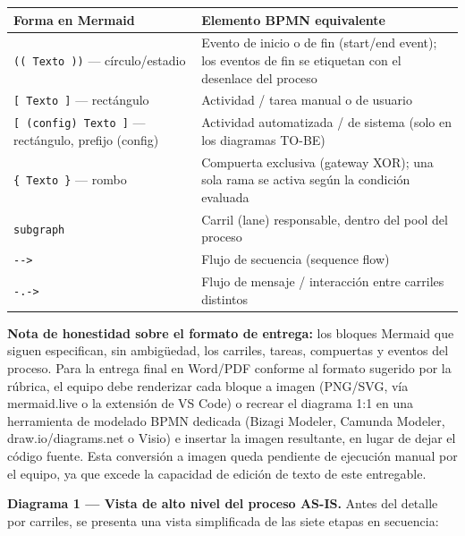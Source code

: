 \documentclass[11pt,a4paper]{article}
\begin{document}
{\small
\begin{longtable}[]{@{}
  >{\raggedright\arraybackslash}p{}
  >{\raggedright\arraybackslash}p{}@{}}
\toprule\noalign{}
\begin{minipage}[b]{\linewidth}\raggedright
Forma en Mermaid
\end{minipage} & \begin{minipage}[b]{\linewidth}\raggedright
Elemento BPMN equivalente
\end{minipage} \\
\midrule\noalign{}
\endhead
\bottomrule\noalign{}
\endlastfoot
\texttt{((\ Texto\ ))} --- círculo/estadio & Evento de inicio o de fin (start/end event); los eventos de fin se etiquetan con el desenlace del proceso \\
\texttt{{[}\ Texto\ {]}} --- rectángulo & Actividad / tarea manual o de usuario \\
\texttt{{[}\ (config)\ Texto\ {]}} --- rectángulo, prefijo (config) & Actividad automatizada / de sistema (solo en los diagramas TO-BE) \\
\texttt{\{\ Texto\ \}} --- rombo & Compuerta exclusiva (gateway XOR); una sola rama se activa según la condición evaluada \\
\texttt{subgraph} & Carril (lane) responsable, dentro del pool del proceso \\
\texttt{-\/-\textgreater{}} & Flujo de secuencia (sequence flow) \\
\texttt{-.-\textgreater{}} & Flujo de mensaje / interacción entre carriles distintos \\
\end{longtable}
}

\textbf{Nota de honestidad sobre el formato de entrega:} los bloques Mermaid que siguen especifican, sin ambigüedad, los carriles, tareas, compuertas y eventos del proceso. Para la entrega final en Word/PDF conforme al formato sugerido por la rúbrica, el equipo debe renderizar cada bloque a imagen (PNG/SVG, vía mermaid.live o la extensión de VS Code) o recrear el diagrama 1:1 en una herramienta de modelado BPMN dedicada (Bizagi Modeler, Camunda Modeler, draw.io/diagrams.net o Visio) e insertar la imagen resultante, en lugar de dejar el código fuente. Esta conversión a imagen queda pendiente de ejecución manual por el equipo, ya que excede la capacidad de edición de texto de este entregable.

\textbf{Diagrama 1 --- Vista de alto nivel del proceso AS-IS.} Antes del detalle por carriles, se presenta una vista simplificada de las siete etapas en secuencia:
\end{document}
